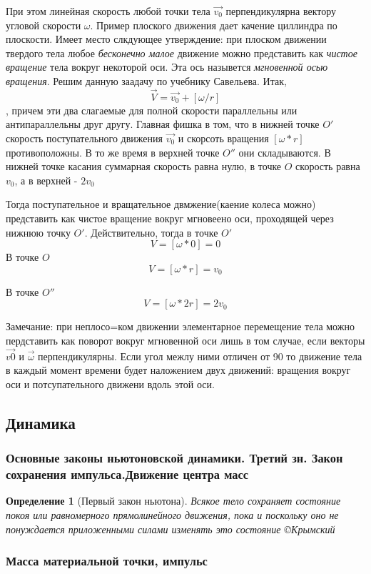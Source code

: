 \documentclass{article}
\newtheorem{theorem}{Определение} %
\begin{document}
При этом линейная скорость любой точки тела $\vec{v_0}$ перпендикулярна вектору угловой скорости $\omega$.
Пример плоского движения дает качение циллиндра по плоскости. Имеет место слкдующее утверждение: при плоском движении твердого тела любое \emph{бесконечно малое} движение можно представить как \emph{чистое вращение} тела вокруг некоторой оси. Эта ось назывется \emph{мгновенной осью вращения}. Решим данную заадачу по учебнику Савельева. Итак, $$\vec{V} = \vec{v_0} + [\omega/r]$$, причем эти два слагаемые для полной скорости параллельны или антипараллельны друг другу. Главная фишка в том, что в нижней точке $O'$ скорость поступательного движения $\vec{v_0}$ и скорсоть вращения $[\omega *r]$ противоположны. В то же время в верхней точке $O''$ они складываются. В нижней точке касания суммарная скорость равна нулю, в точке $O$ скорость равна $v_0$, а в верхней - $2v_0$

Тогда поступательное и вращательное двмжение(каение колеса можно) представить как чистое вращение вокруг мгновеено оси, проходящей через нижнюю точку $O'$. Действительно, тогда в точке $O'$
$$V = [\omega*0] = 0$$
В точке $O$
$$V = [\omega*r] = v_0$$

В точке $O''$
$$V = [\omega*2r] = 2v_0$$

Замечание: при неплосо=ком движении элементарное перемещение тела можно пердставить как поворот вокруг мгновенной оси лишь в том случае, если векторы $\vec{v0}$ и $\vec{\omega}$ перпендикулярны. Если угол межлу ними отличен от 90 то движение тела в каждый момент времени будет наложением двух движений: вращения вокруг оси и потсупательного движени вдоль этой оси.
\subsection{Динамика}
\subsubsection{Основные законы ньютоновской динамики.  Третий зн. Закон сохранения импульса.Движение центра масс} 
\begin{theorem}[Первый закон ньютона]
Всякое тело сохраняет состояние покоя или равномерного прямолинейного движения, пока и поскольку оно не понуждается приложенными силами изменять это состояние
\copyright{Крымский}
\end{theorem}


\subsubsection{Масса материальной точки, импульс}
\end{document}
